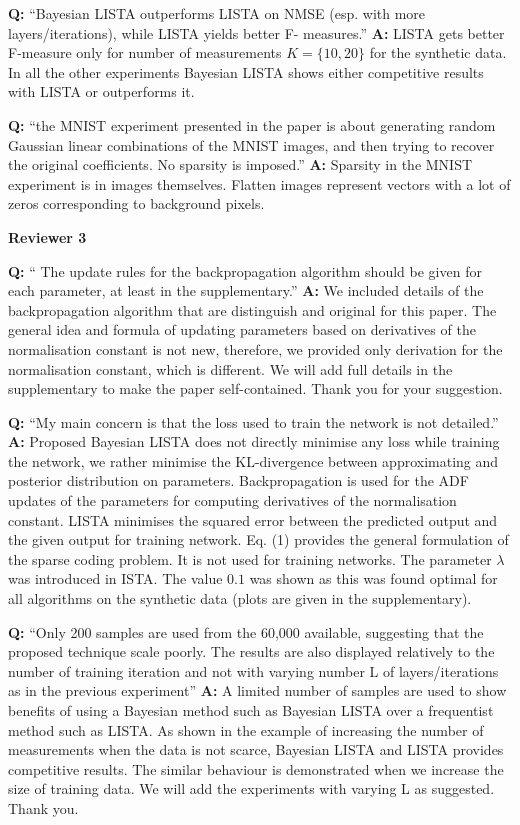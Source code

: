 \documentclass{article}
\begin{document}
\textbf{Q:} ``Bayesian LISTA outperforms LISTA on NMSE (esp. with more layers/iterations), while LISTA yields better F- measures.''  
\textbf{A:} LISTA gets better F-measure only for number of measurements $K = \{10, 20\}$ for the synthetic data. In all the other experiments Bayesian LISTA shows either competitive results with LISTA or outperforms it.

\textbf{Q:} ``the MNIST experiment presented in the paper is about generating random Gaussian linear combinations of the MNIST images, and then trying to recover the original coefficients. No sparsity is imposed.'' 
\textbf{A:} Sparsity in the MNIST experiment is in images themselves. Flatten images represent vectors with a lot of zeros corresponding to background pixels.

\textbf{Reviewer 3}

\textbf{Q:} `` The update rules for the backpropagation algorithm should be given for each parameter, at least in the supplementary.'' 
\textbf{A:} We included details of the backpropagation algorithm that are distinguish and original for this paper. The general idea and formula of updating parameters based on derivatives of the normalisation constant is not new, therefore, we provided only derivation for the normalisation constant, which is different. We will add full details in the supplementary to make the paper self-contained. Thank you for your suggestion. 

\textbf{Q:} ``My main concern is that the loss used to train the network is not detailed.'' 
\textbf{A:} Proposed Bayesian LISTA does not directly minimise any loss while training the network, we rather minimise the KL-divergence between approximating and posterior distribution on parameters. Backpropagation is used for the ADF updates of the parameters for computing derivatives of the normalisation constant. LISTA minimises the squared error between the predicted output and the given output for training network. Eq. (1) provides the general formulation of the sparse coding problem. It is not used for training networks. The parameter $\lambda$ was introduced in ISTA. The value $0.1$ was shown as this was found optimal for all algorithms on the synthetic data (plots are given in the supplementary).

\textbf{Q:} ``Only 200 samples are used from the 60,000 available, suggesting that the proposed technique scale poorly. The results are also displayed relatively to the number of training iteration and not with varying number L of layers/iterations as in the previous experiment'' 
\textbf{A:} A limited number of samples are used to show benefits of using a Bayesian method such as Bayesian LISTA over a frequentist method such as LISTA. As shown in the example of increasing the number of measurements when the data is not scarce, Bayesian LISTA and LISTA provides competitive results. The similar behaviour is demonstrated when we increase the size of training data. We will add the experiments with varying L as suggested. Thank you. 
\end{document}
